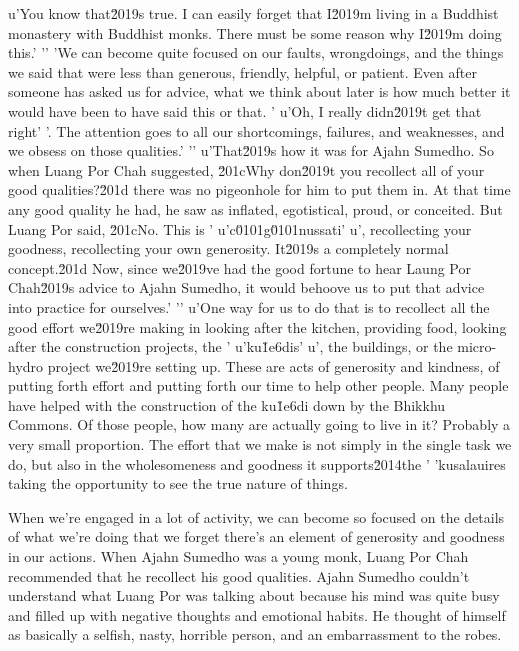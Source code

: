 u'You know that\u2019s true. I can easily forget that I\u2019m living in a Buddhist monastery with Buddhist monks. There must be some reason why I\u2019m doing this.'
'\n'
'We can become quite focused on our faults, wrongdoings, and the things we said that were less than generous, friendly, helpful, or patient. Even after someone has asked us for advice, what we think about later is how much better it would have been to have said this or that. '
u'Oh, I really didn\u2019t get that right'
'. The attention goes to all our shortcomings, failures, and weaknesses, and we obsess on those qualities.'
'\n'
u'That\u2019s how it was for Ajahn Sumedho. So when Luang Por Chah suggested, \u201cWhy don\u2019t you recollect all of your good qualities?\u201d there was no pigeonhole for him to put them in. At that time any good quality he had, he saw as inflated, egotistical, proud, or conceited. But Luang Por said, \u201cNo. This is '
u'c\u0101g\u0101nussati'
u', recollecting your goodness, recollecting your own generosity. It\u2019s a completely normal concept.\u201d Now, since we\u2019ve had the good fortune to hear Laung Por Chah\u2019s advice to Ajahn Sumedho, it would behoove us to put that advice into practice for ourselves.'
'\n'
u'One way for us to do that is to recollect all the good effort we\u2019re making in looking after the kitchen, providing food, looking after the construction projects, the '
u'ku\u1e6dis'
u', the buildings, or the micro-hydro project we\u2019re setting up. These are acts of generosity and kindness, of putting forth effort and putting forth our time to help other people. Many people have helped with the construction of the ku\u1e6di down by the Bhikkhu Commons. Of those people, how many are actually going to live in it? Probably a very small proportion. The effort that we make is not simply in the single task we do, but also in the wholesomeness and goodness it supports\u2014the '
'kusalauires taking the opportunity to see the 
true nature of things.


When we're engaged in a lot of activity, we can become so focused on 
the details of what we're doing that we forget there's an element of 
generosity and goodness in our actions. When Ajahn Sumedho was a young 
monk, Luang Por Chah recommended that he recollect his good qualities. 
Ajahn Sumedho couldn't understand what Luang Por was talking about 
because his mind was quite busy and filled up with negative thoughts 
and emotional habits. He thought of himself as basically a selfish, 
nasty, horrible person, and an embarrassment to the robes.

